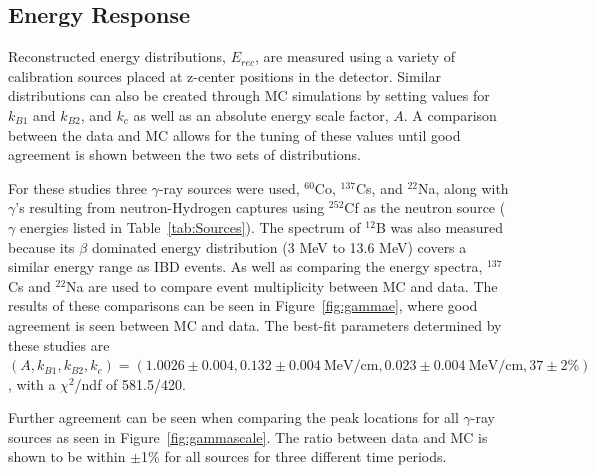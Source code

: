 \subsection{Energy Response}

Reconstructed energy distributions, $E_{rec}$, are measured using a variety of calibration sources placed at z-center positions in the detector. 
Similar distributions can also be created through MC simulations by setting values for $k_{B1}$ and $k_{B2}$, and $k_c$ as well as an absolute energy scale factor, $A$.
A comparison between the data and MC allows for the tuning of these values until good agreement is shown between the two sets of distributions.

For these studies three $\gamma$-ray sources were used, $^{60}$Co, $^{137}$Cs, and $^{22}$Na, along with $\gamma$'s resulting from neutron-Hydrogen captures using $^{252}$Cf as the neutron source ($\gamma$ energies listed in Table~\ref{tab:Sources}).
The spectrum of $^{12}$B was also measured because its $\beta$ dominated energy distribution  (3 MeV to 13.6 MeV) covers a similar energy range as IBD events.
As well as comparing the energy spectra, $^{137}$Cs and $^{22}$Na are used to compare event multiplicity between MC and data.
The results of these comparisons can be seen in Figure~\ref{fig:gammae}, where good agreement is seen between MC and data.
The best-fit parameters determined by these studies are $(A,k_{B1},k_{B2},k_c) = (1.0026\pm0.004,0.132\pm0.004 ~\textrm{MeV/cm}, 0.023\pm0.004~\textrm{MeV/cm}, 37\pm2\%)$, with a $\chi^2$/ndf of 581.5/420.

Further agreement can be seen when comparing the peak locations for all $\gamma$-ray sources as seen in Figure~\ref{fig:gammascale}. The ratio between data and MC is shown to be within $\pm$1\% for all sources for three different time periods.




